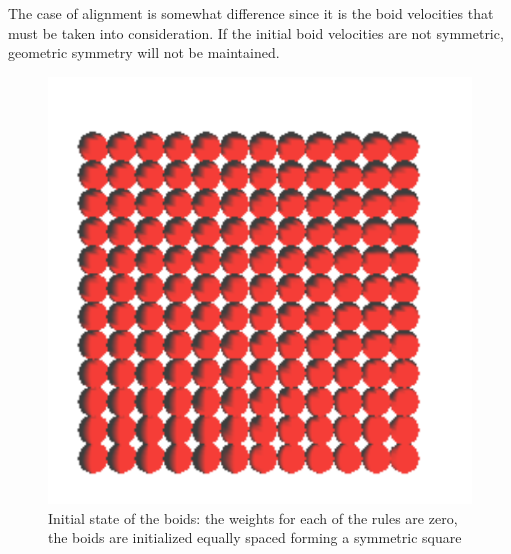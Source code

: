 The case of alignment is somewhat difference since it is the boid velocities that must be taken into consideration. If the initial boid velocities are not symmetric, geometric symmetry will not be maintained. 


\begin{figure}[htbp]
\begin{center}
\includegraphics[scale=0.5]{figures/align.pdf}
\caption{Initial state of the boids: the weights for each of the rules are zero, the boids are initialized equally spaced forming a symmetric square}
\label{alignRule}
\end{center}
\end{figure}

